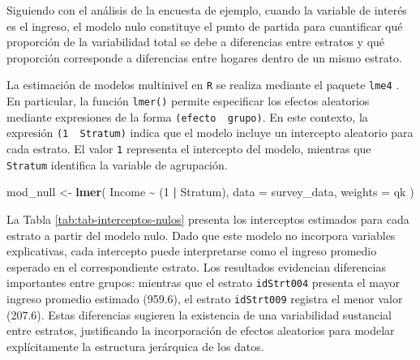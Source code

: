 \documentclass[
  spanish,
  12pt,
]{book}
\newenvironment{Shaded}{\begin{snugshade}}{\end{snugshade}}
\newcommand{\AttributeTok}[1]{\textcolor[rgb]{0.13,0.29,0.53}{#1}}
\newcommand{\DataTypeTok}[1]{\textcolor[rgb]{0.13,0.29,0.53}{#1}}
\newcommand{\DecValTok}[1]{\textcolor[rgb]{0.00,0.00,0.81}{#1}}
\newcommand{\FunctionTok}[1]{\textcolor[rgb]{0.13,0.29,0.53}{\textbf{#1}}}
\newcommand{\NormalTok}[1]{#1}
\newcommand{\OtherTok}[1]{\textcolor[rgb]{0.56,0.35,0.01}{#1}}
\newcommand{\SpecialCharTok}[1]{\textcolor[rgb]{0.81,0.36,0.00}{\textbf{#1}}}
\begin{document}
Siguiendo con el análisis de la encuesta de ejemplo, cuando la variable de interés es el ingreso, el modelo nulo constituye el punto de partida para cuantificar qué proporción de la variabilidad total se debe a diferencias entre estratos y qué proporción corresponde a diferencias entre hogares dentro de un mismo estrato.

La estimación de modelos multinivel en \texttt{R} se realiza mediante el paquete \texttt{lme4} \citep{lme42026}. En particular, la función \texttt{lmer()} permite especificar los efectos aleatorios mediante expresiones de la forma \texttt{(efecto\ \textbar{}\ grupo)}. En este contexto, la expresión \texttt{(1\ \textbar{}\ Stratum)} indica que el modelo incluye un intercepto aleatorio para cada estrato. El valor \texttt{1} representa el intercepto del modelo, mientras que \texttt{Stratum} identifica la variable de agrupación.

\begin{Shaded}
\begin{Highlighting}[]
\NormalTok{mod\_null }\OtherTok{\textless{}{-}} \FunctionTok{lmer}\NormalTok{(}
\NormalTok{  Income }\SpecialCharTok{\textasciitilde{}}\NormalTok{ (}\DecValTok{1} \SpecialCharTok{|}\NormalTok{ Stratum),}
  \AttributeTok{data =}\NormalTok{ survey\_data,}
  \AttributeTok{weights =}\NormalTok{ qk}
\NormalTok{)}
\end{Highlighting}
\end{Shaded}

La Tabla \ref{tab:tab-interceptos-nulos} presenta los interceptos estimados para cada estrato a partir del modelo nulo. Dado que este modelo no incorpora variables explicativas, cada intercepto puede interpretarse como el ingreso promedio esperado en el correspondiente estrato. Los resultados evidencian diferencias importantes entre grupos: mientras que el estrato \texttt{idStrt004} presenta el mayor ingreso promedio estimado (959.6), el estrato \texttt{idStrt009} registra el menor valor (207.6). Estas diferencias sugieren la existencia de una variabilidad sustancial entre estratos, justificando la incorporación de efectos aleatorios para modelar explícitamente la estructura jerárquica de los datos.

\begin{Shaded}
\end{Shaded}
\end{document}
